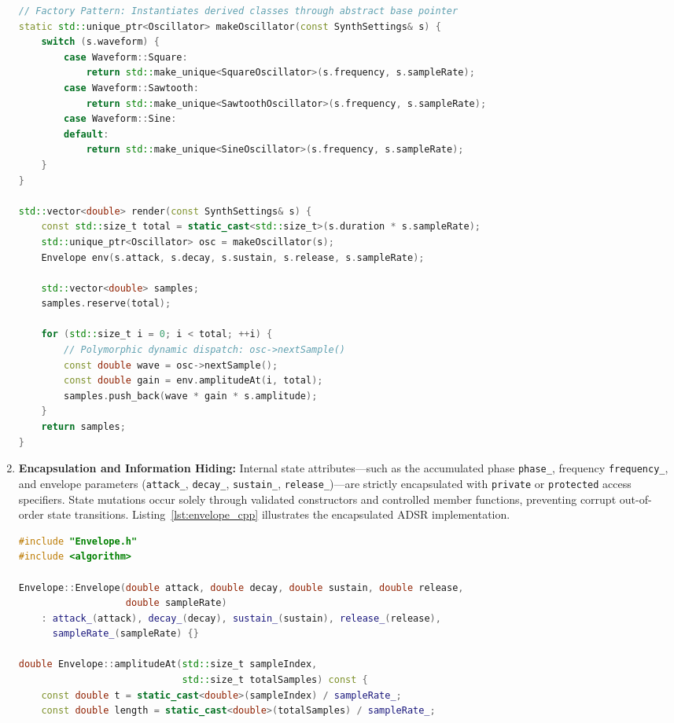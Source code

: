 \documentclass[12pt,a4paper,oneside]{book}
\begin{document}
\begin{enumerate}
\begin{lstlisting}[language=C++, caption={Polymorphic Factory and Rendering Pipeline (\texttt{src/Synth.cpp})}, label={lst:synth_cpp}]
// Factory Pattern: Instantiates derived classes through abstract base pointer
static std::unique_ptr<Oscillator> makeOscillator(const SynthSettings& s) {
    switch (s.waveform) {
        case Waveform::Square:
            return std::make_unique<SquareOscillator>(s.frequency, s.sampleRate);
        case Waveform::Sawtooth:
            return std::make_unique<SawtoothOscillator>(s.frequency, s.sampleRate);
        case Waveform::Sine:
        default:
            return std::make_unique<SineOscillator>(s.frequency, s.sampleRate);
    }
}

std::vector<double> render(const SynthSettings& s) {
    const std::size_t total = static_cast<std::size_t>(s.duration * s.sampleRate);
    std::unique_ptr<Oscillator> osc = makeOscillator(s);
    Envelope env(s.attack, s.decay, s.sustain, s.release, s.sampleRate);

    std::vector<double> samples;
    samples.reserve(total);

    for (std::size_t i = 0; i < total; ++i) {
        // Polymorphic dynamic dispatch: osc->nextSample()
        const double wave = osc->nextSample();
        const double gain = env.amplitudeAt(i, total);
        samples.push_back(wave * gain * s.amplitude);
    }
    return samples;
}
\end{lstlisting}

    \item \textbf{Encapsulation and Information Hiding:} 
    Internal state attributes—such as the accumulated phase \texttt{phase\_}, frequency \texttt{frequency\_}, and envelope parameters (\texttt{attack\_}, \texttt{decay\_}, \texttt{sustain\_}, \texttt{release\_})—are strictly encapsulated with \texttt{private} or \texttt{protected} access specifiers. State mutations occur solely through validated constructors and controlled member functions, preventing corrupt out-of-order state transitions. Listing~\ref{lst:envelope_cpp} illustrates the encapsulated ADSR implementation.

\begin{lstlisting}[language=C++, caption={Encapsulated ADSR Dynamic Envelope Modulator (\texttt{src/Envelope.cpp})}, label={lst:envelope_cpp}]
#include "Envelope.h"
#include <algorithm>

Envelope::Envelope(double attack, double decay, double sustain, double release,
                   double sampleRate)
    : attack_(attack), decay_(decay), sustain_(sustain), release_(release),
      sampleRate_(sampleRate) {}

double Envelope::amplitudeAt(std::size_t sampleIndex,
                             std::size_t totalSamples) const {
    const double t = static_cast<double>(sampleIndex) / sampleRate_;
    const double length = static_cast<double>(totalSamples) / sampleRate_;


\end{lstlisting}
\end{enumerate}
\end{document}

